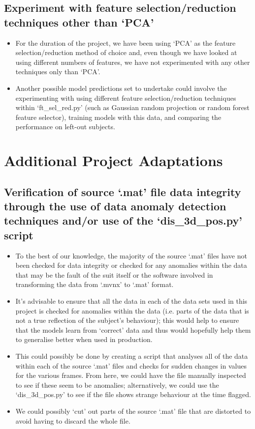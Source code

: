 \documentclass[12pt,twoside]{report}
\begin{document}
\subsection{Experiment with feature selection/reduction techniques other than ‘PCA’}
\begin{itemize}
	\item For the duration of the project, we have been using ‘PCA’ as the feature selection/reduction method of choice and, even though we have looked at using different numbers of features, we have not experimented with any other techniques only than ‘PCA’.
	\item Another possible model predictions set to undertake could involve the experimenting with using different feature selection/reduction techniques within ‘ft\_sel\_red.py’ (such as Gaussian random projection or random forest feature selector), training models with this data, and comparing the performance on left-out subjects.
\end{itemize}



\section{Additional Project Adaptations}

\subsection{Verification of source ‘.mat’ file data integrity through the use of data anomaly detection techniques and/or use of the ‘dis\_3d\_pos.py’ script}
\begin{itemize}
	\item To the best of our knowledge, the majority of the source ‘.mat’ files have not been checked for data integrity or checked for any anomalies within the data that may be the fault of the suit itself or the software involved in transforming the data from ‘.mvnx’ to ‘.mat’ format.
	\item It’s advisable to ensure that all the data in each of the data sets used in this project is checked for anomalies within the data (i.e. parts of the data that is not a true reflection of the subject’s behaviour); this would help to ensure that the models learn from ‘correct’ data and thus would hopefully help them to generalise better when used in production.
	\item This could possibly be done by creating a script that analyses all of the data within each of the source ‘.mat’ files and checks for sudden changes in values for the various frames. From here, we could have the file manually inspected to see if these seem to be anomalies; alternatively, we could use the ‘dis\_3d\_pos.py’ to see if the file shows strange behaviour at the time flagged.
	\item We could possibly ‘cut’ out parts of the source ‘.mat’ file that are distorted to avoid having to discard the whole file.
\end{itemize}
\end{document}

